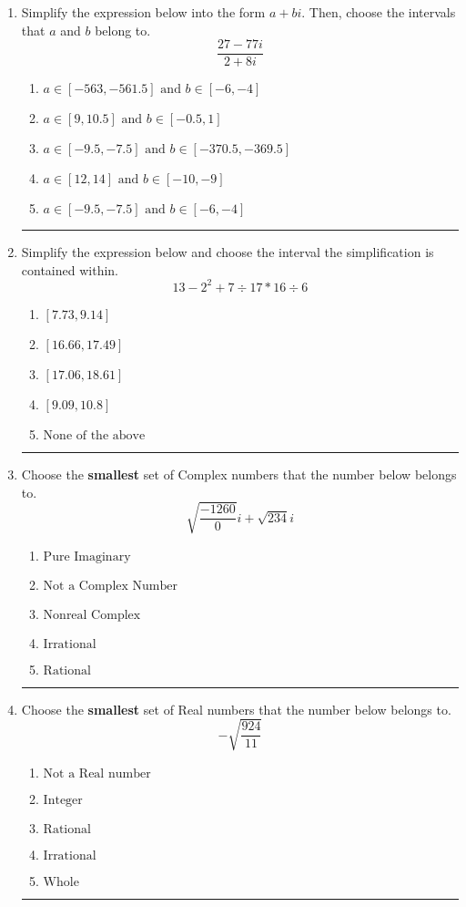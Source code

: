 \documentclass[14pt]{extbook}
\newcommand{\litem}[1]{\item#1\hspace*{-1cm}\rule{\textwidth}{0.4pt}}
\begin{document}
\begin{enumerate}
{\begin{enumerate}[label=\Alph*.]
\end{enumerate} }
\litem{
Simplify the expression below into the form $a+bi$. Then, choose the intervals that $a$ and $b$ belong to.\[ \frac{27 - 77 i}{2 + 8 i} \]\begin{enumerate}[label=\Alph*.]
\item \( a \in [-563, -561.5] \text{ and } b \in [-6, -4] \)
\item \( a \in [9, 10.5] \text{ and } b \in [-0.5, 1] \)
\item \( a \in [-9.5, -7.5] \text{ and } b \in [-370.5, -369.5] \)
\item \( a \in [12, 14] \text{ and } b \in [-10, -9] \)
\item \( a \in [-9.5, -7.5] \text{ and } b \in [-6, -4] \)

\end{enumerate} }
\litem{
Simplify the expression below and choose the interval the simplification is contained within.\[ 13 - 2^2 + 7 \div 17 * 16 \div 6 \]\begin{enumerate}[label=\Alph*.]
\item \( [7.73, 9.14] \)
\item \( [16.66, 17.49] \)
\item \( [17.06, 18.61] \)
\item \( [9.09, 10.8] \)
\item \( \text{None of the above} \)

\end{enumerate} }
\litem{
Choose the \textbf{smallest} set of Complex numbers that the number below belongs to.\[ \sqrt{\frac{-1260}{0}} i+\sqrt{234}i \]\begin{enumerate}[label=\Alph*.]
\item \( \text{Pure Imaginary} \)
\item \( \text{Not a Complex Number} \)
\item \( \text{Nonreal Complex} \)
\item \( \text{Irrational} \)
\item \( \text{Rational} \)

\end{enumerate} }
\litem{
Choose the \textbf{smallest} set of Real numbers that the number below belongs to.\[ -\sqrt{\frac{924}{11}} \]\begin{enumerate}[label=\Alph*.]
\item \( \text{Not a Real number} \)
\item \( \text{Integer} \)
\item \( \text{Rational} \)
\item \( \text{Irrational} \)
\item \( \text{Whole} \)


\end{enumerate}}
\end{enumerate}
\end{document}
